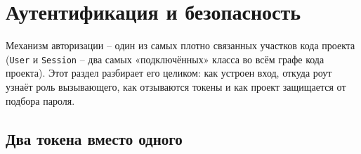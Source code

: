\section{Аутентификация и безопасность}

Механизм авторизации -- один из самых плотно связанных участков кода
проекта (\texttt{User} и \texttt{Session} -- два самых «подключённых»
класса во всём графе кода проекта). Этот раздел разбирает его целиком:
как устроен вход, откуда роут узнаёт роль вызывающего, как отзываются
токены и как проект защищается от подбора пароля.

\subsection{Два токена вместо одного}

